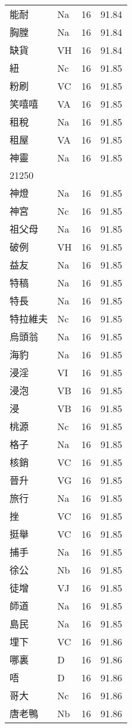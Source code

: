 \documentclass[twocolumn]{book}
\begin{document}
\begin{supertabular}{llrr}
能耐 & Na & 16 &  91.84\\
胸膛 & Na & 16 &  91.84\\
缺貨 & VH & 16 &  91.84\\
紐 & Nc & 16 &  91.85\\
粉刷 & VC & 16 &  91.85\\
笑嘻嘻 & VA & 16 &  91.85\\
租稅 & Na & 16 &  91.85\\
租屋 & VA & 16 &  91.85\\
神靈 & Na & 16 &  91.85\\
21250\\
神燈 & Na & 16 &  91.85\\
神宮 & Nc & 16 &  91.85\\
祖父母 & Na & 16 &  91.85\\
破例 & VH & 16 &  91.85\\
益友 & Na & 16 &  91.85\\
特稿 & Na & 16 &  91.85\\
特長 & Na & 16 &  91.85\\
特拉維夫 & Nc & 16 &  91.85\\
烏頭翁 & Na & 16 &  91.85\\
海豹 & Na & 16 &  91.85\\
浸淫 & VI & 16 &  91.85\\
浸泡 & VB & 16 &  91.85\\
浸 & VB & 16 &  91.85\\
桃源 & Nc & 16 &  91.85\\
格子 & Na & 16 &  91.85\\
核銷 & VC & 16 &  91.85\\
晉升 & VG & 16 &  91.85\\
旅行 & Na & 16 &  91.85\\
挫 & VC & 16 &  91.85\\
挺舉 & VC & 16 &  91.85\\
捕手 & Na & 16 &  91.85\\
徐公 & Nb & 16 &  91.85\\
徒增 & VJ & 16 &  91.85\\
師道 & Na & 16 &  91.85\\
島民 & Na & 16 &  91.85\\
埋下 & VC & 16 &  91.86\\
哪裏 & D & 16 &  91.86\\
唔 & D & 16 &  91.86\\
哥大 & Nc & 16 &  91.86\\
唐老鴨 & Nb & 16 &  91.86\\

\end{supertabular}
\end{document}
